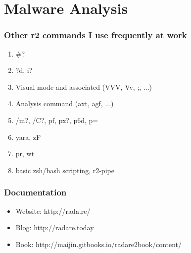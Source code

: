 \documentclass[10pt, compress]{beamer}
\begin{document}
\section{Malware Analysis}

\begin{frame}[fragile]
  \frametitle{Other r2 commands I use frequently at work}
  \begin{enumerate}
   \item \#?
   \item ?d, i?
   \item Visual mode and associated (VVV, Vv, ;, ...)
   \item Analysis command (axt, agf, ...)
   \item /m?, /C?, pf, px?, p6d, p=
   \item yara, zF
   \item pr, wt
   \item basic zsh/bash scripting, r2-pipe
 \end{enumerate}
\end{frame}

\begin{frame}[fragile]
  \frametitle{Documentation}
    \begin{itemize}
    \item \alert{Website:} http://rada.re/
    \item \alert{Blog:} http://radare.today
    \item \alert{Book:} http://maijin.gitbooks.io/radare2book/content/
    \end{itemize}
\end{frame}
\end{document}
